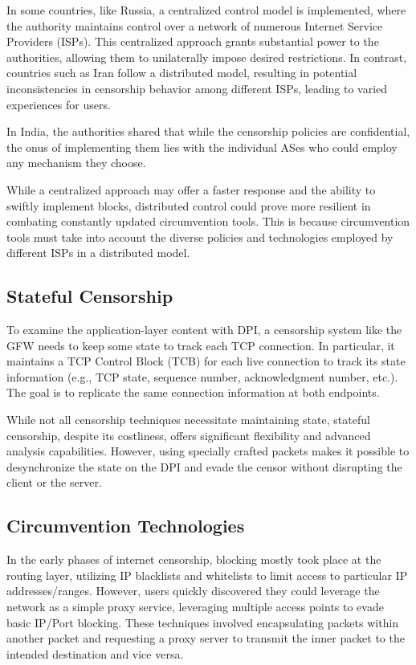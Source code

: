 In some countries, like Russia, a centralized control model is implemented, where the authority maintains control over a network of numerous Internet Service Providers (ISPs). This centralized approach grants substantial power to the authorities, allowing them to unilaterally impose desired restrictions. In contrast, countries such as Iran follow a distributed model, resulting in potential inconsistencies in censorship behavior among different ISPs, leading to varied experiences for users.\cite{xue2021throttling}

In India, the authorities shared that while the censorship policies are confidential, the onus of implementing them lies with the individual ASes who could employ any mechanism they choose.\cite{yadav2018light}

While a centralized approach may offer a faster response and the ability to swiftly implement blocks, distributed control could prove more resilient in combating constantly updated circumvention tools. This is because circumvention tools must take into account the diverse policies and technologies employed by different ISPs in a distributed model.

\subsection{Stateful Censorship}
To examine the application-layer content with DPI, a censorship system like the GFW needs to keep some state to track each TCP connection. In particular, it maintains a TCP Control Block (TCB) for each live connection to track its state information (e.g., TCP state, sequence number, acknowledgment number, etc.). The goal is to replicate the same connection information at both endpoints. \cite{wang2017state}

While not all censorship techniques necessitate maintaining state, stateful censorship, despite its costliness, offers significant flexibility and advanced analysis capabilities. However, using specially crafted packets makes it possible to desynchronize the state on the DPI and evade the censor without disrupting the client or the server.

\subsection{Circumvention Technologies}
In the early phases of internet censorship, blocking mostly took place at the routing layer, utilizing IP blacklists and whitelists to limit access to particular IP addresses/ranges. However, users quickly discovered they could leverage the network as a simple proxy service, leveraging multiple access points to evade basic IP/Port blocking. These techniques involved encapsulating packets within another packet and requesting a proxy server to transmit the inner packet to the intended destination and vice versa.


